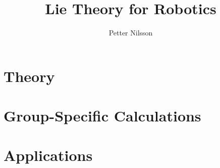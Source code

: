 \documentclass{scrbook}
\title{Lie Theory for Robotics}
\author{Petter Nilsson}
\begin{document}
\frontmatter

\maketitle

\tableofcontents

\mainmatter



\part{Theory}













\part{Group-Specific Calculations}








\part{Applications}



















\backmatter

\printbibliography

% 

\end{document}

